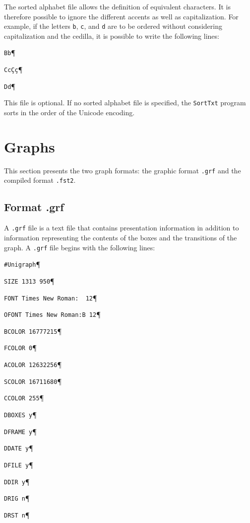 \bigskip
\noindent The sorted alphabet file allows the definition of equivalent characters.
It is therefore possible to ignore the different accents as well as
capitalization. For example, if the letters \verb+b+, \verb+c+, and \verb+d+ are
to be ordered without considering capitalization and the cedilla, it is possible
to write the following lines:

\bigskip
\noindent
\texttt{Bb}\P

\noindent
\texttt{Cc\c{C}\c{c}}\P

\noindent
\texttt{Dd}\P

\bigskip
\noindent This file is optional. If no sorted alphabet file is specified, the
\verb+SortTxt+ program sorts in the order of the Unicode encoding.


\section{Graphs}
This section presents the two graph formats: the graphic format \verb+.grf+ and
the compiled format \verb+.fst2+.


\subsection{Format .grf}
A \verb+.grf+ file is a text file that contains presentation information in
addition to information representing the contents of the boxes and the
transitions of the graph. A \verb+.grf+ file begins with the following lines:

\bigskip
\verb+#Unigraph+\P

\verb+SIZE 1313 950+\P

\verb+FONT Times New Roman:  12+\P

\verb+OFONT Times New Roman:B 12+\P

\verb+BCOLOR 16777215+\P

\verb+FCOLOR 0+\P

\verb+ACOLOR 12632256+\P

\verb+SCOLOR 16711680+\P

\verb+CCOLOR 255+\P

\verb+DBOXES y+\P

\verb+DFRAME y+\P

\verb+DDATE y+\P

\verb+DFILE y+\P

\verb+DDIR y+\P

\verb+DRIG n+\P

\verb+DRST n+\P

